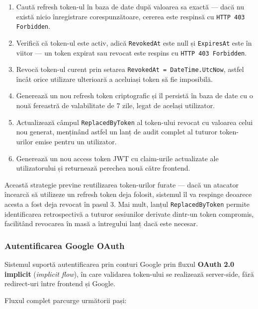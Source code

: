 \documentclass[12pt, a4paper]{report}
\begin{document}
\begin{enumerate}
    \item Caută refresh token-ul în baza de date după valoarea sa exactă --- dacă nu
          există nicio înregistrare corespunzătoare, cererea este respinsă cu
          \texttt{HTTP 403 Forbidden}.
    \item Verifică că token-ul este activ, adică \texttt{RevokedAt} este null și
          \texttt{ExpiresAt} este în viitor --- un token expirat sau revocat este
          respins cu \texttt{HTTP 403 Forbidden}.
    \item Revocă token-ul curent prin setarea \texttt{RevokedAt = DateTime.UtcNow},
          astfel încât orice utilizare ulterioară a aceluiași token să fie imposibilă.
    \item Generează un nou refresh token criptografic și îl persistă în baza de date
          cu o nouă fereastră de valabilitate de 7 zile, legat de același utilizator.
    \item Actualizează câmpul \texttt{ReplacedByToken} al token-ului revocat cu
          valoarea celui nou generat, menținând astfel un lanț de audit complet al
          tuturor token-urilor emise pentru un utilizator.
    \item Generează un nou access token JWT cu claim-urile actualizate ale
          utilizatorului și returnează perechea nouă către frontend.
\end{enumerate}

Această strategie previne reutilizarea token-urilor furate --- dacă un atacator
încearcă să utilizeze un refresh token deja folosit, sistemul îl va respinge deoarece
acesta a fost deja revocat în pasul 3. Mai mult, lanțul \texttt{ReplacedByToken}
permite identificarea retrospectivă a tuturor sesiunilor derivate dintr-un token
compromis, facilitând revocarea în masă a întregului lanț dacă este necesar.


\subsubsection{Autentificarea Google OAuth}

Sistemul suportă autentificarea prin conturi Google prin fluxul \textbf{OAuth 2.0
implicit} (\textit{implicit flow}), în care validarea token-ului se realizează
server-side, fără redirect-uri între frontend și Google.

Fluxul complet parcurge următorii pași:
\end{document}
